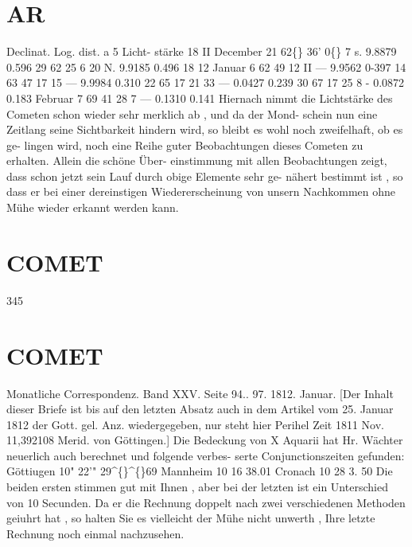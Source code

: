 \documentclass[12pt,a4paper]{article}
\newcommand{\degree}{\textdegree}
\begin{document}
\section*{AR}
Declinat. 
Log.  dist. 
a  5 
Licht- 
stärke 
18 II  December  21 
62\degree\{\}  36' 
0\degree\{\}   7  s. 
9.8879 
0.596 
29 
62    25 
6    20  N. 
9.9185 
0.496 
18 12  Januar         6 
62    49 
12    II  --- 
9.9562 
0-397 
14 
63    47 
17    15  --- 
9.9984 
0.310 
22 
65    17 
21     33  --- 
0.0427 
0.239 
30 
67    17 
25      8  - 
0.0872 
0.183 
Februar       7 
69    41 
28      7  --- 
0.1310 
0.141 
Hiernach  nimmt  die  Lichtstärke  des  Cometen  schon  wieder  sehr  merklich  ab ,  und  da  der  Mond- 
schein nun  eine  Zeitlang  seine  Sichtbarkeit  hindern  wird,  so  bleibt  es  wohl  noch  zweifelhaft,  ob  es  ge- 
lingen wird,  noch  eine  Reihe  guter  Beobachtungen  dieses  Cometen  zu  erhalten.  Allein  die  schöne  Über- 
einstimmung mit  allen  Beobachtungen  zeigt,  dass  schon  jetzt  sein  Lauf  durch  obige  Elemente  sehr  ge- 
nähert bestimmt  ist ,  so  dass  er  bei  einer  dereinstigen  Wiedererscheinung  von  unsern  Nachkommen  ohne 
Mühe  wieder  erkannt  werden  kann. 


\newpage

\section*{COMET}
345 

\section*{COMET}
Monatliche  Correspondenz.     Band  XXV.  Seite  94.. 97.     1812.  Januar. 
[Der  Inhalt  dieser  Briefe  ist  bis  auf  den  letzten  Absatz  auch  in  dem  Artikel  vom  25.  Januar  1812 
der  Gott.  gel.  Anz.  wiedergegeben,    nur  steht    hier    Perihel  Zeit   1811  Nov.  11,392108  Merid.  von 
Göttingen.] 
Die  Bedeckung  von  X  Aquarii  hat  Hr.  Wächter  neuerlich  auch  berechnet  und  folgende  verbes- 
serte Conjunctionszeiten  gefunden: 
Göttiugen 
10" 
22'"  29\textasciicircum\{\}\textasciicircum\{\}69 
Mannheim 
10 
16     38.01 
Cronach 
10 
28       3. 50 
Die  beiden  ersten  stimmen  gut  mit  Ihnen ,  aber  bei  der  letzten  ist  ein  Unterschied  von  10  Secunden. 
Da  er  die  Rechnung  doppelt  nach  zwei  verschiedenen  Methoden  geiuhrt  hat ,  so  halten  Sie  es  vielleicht 
der  Mühe  nicht  unwerth ,  Ihre  letzte  Rechnung  noch  einmal  nachzusehen. 
\end{document}
